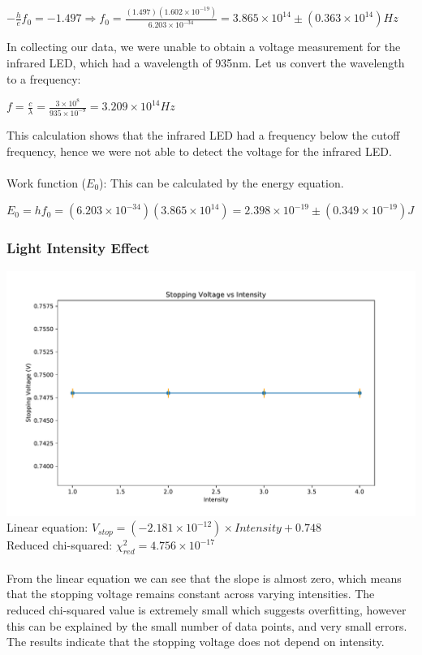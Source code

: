 \documentclass[a4paper, 11pt]{article}
\begin{document}
\begin{center}
$-\frac{h}{e}f_0 = -1.497 \Rightarrow f_0 = \frac{(1.497)(1.602 \times 10^{-19})}{6.203 \times 10^{-34}} = 3.865 \times 10^{14} \pm (0.363 \times 10^{14}) Hz$
\end{center}
In collecting our data, we were unable to obtain a voltage measurement for the infrared LED, which had a wavelength of 935nm. Let us convert the wavelength to a frequency:
\begin{center}
$f = \frac{c}{\lambda} = \frac{3 \times 10^{8}}{935 \times 10^{-9}} = 3.209 \times 10^{14}Hz$
\end{center}
This calculation shows that the infrared LED had a frequency below the cutoff frequency, hence we were not able to detect the voltage for the infrared LED. \\
\\
Work function ($E_0$): This can be calculated by the energy equation. 
\begin{center}
$E_0 = hf_0 = (6.203 \times 10^{-34})(3.865 \times 10^{14}) = 2.398 \times 10^{-19} \pm (0.349 \times 10^{-19}) J$
\end{center}

\subsubsection*{Light Intensity Effect}

\includegraphics[width=\textwidth]{vstop_inten.pdf}
Linear equation: $V_{stop} = (-2.181 \times 10^{-12}) \times Intensity + 0.748$ \\
Reduced chi-squared: $\chi^{2}_{red} = 4.756 \times 10^{-17}$ \\
\\
From the linear equation we can see that the slope is almost zero, which means that the stopping voltage remains constant across varying intensities. The reduced chi-squared value is extremely small which suggests overfitting, however this can be explained by the small number of data points, and very small errors. The results indicate that the stopping voltage does not depend on intensity.
\end{document}
